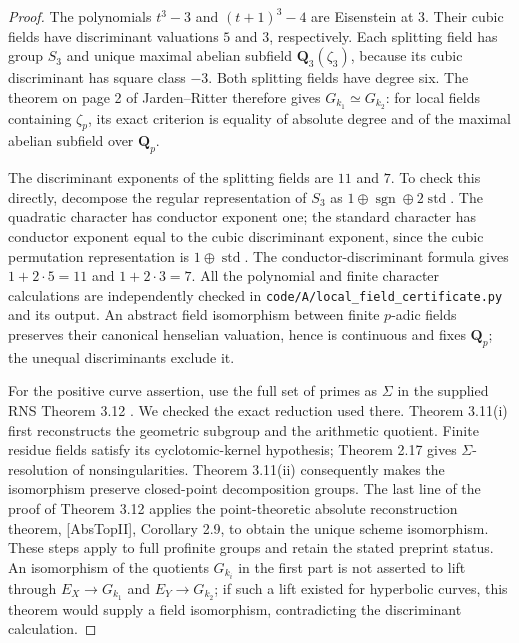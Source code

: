 \begin{proof}
The polynomials $t^3-3$ and $(t+1)^3-4$ are Eisenstein at
$3$. Their cubic fields have discriminant valuations $5$ and
$3$, respectively. Each splitting field has group $S_3$ and
unique maximal abelian subfield $\mathbf Q_3(\zeta_3)$,
because its cubic discriminant has square class $-3$.
Both splitting fields have degree six. The theorem on page 2
of Jarden--Ritter \cite{A_JardenRitter1979} therefore gives
$G_{k_1}\simeq G_{k_2}$: for local fields containing
$\zeta_p$, its exact criterion is equality of absolute degree
and of the maximal abelian subfield over $\mathbf Q_p$.

The discriminant exponents of the splitting fields are $11$
and $7$. To check this directly, decompose the regular
representation of $S_3$ as
$1\oplus\operatorname{sgn}\oplus2\operatorname{std}$.
The quadratic character has conductor exponent one; the
standard character has conductor exponent equal to the
cubic discriminant exponent, since the cubic permutation
representation is $1\oplus\operatorname{std}$. The
conductor-discriminant formula gives $1+2\cdot5=11$ and
$1+2\cdot3=7$. All the polynomial and finite character
calculations are independently checked in
\texttt{code/A/local\_field\_certificate.py} and its output.
An abstract field isomorphism between finite $p$-adic fields
preserves their canonical henselian valuation, hence is
continuous and fixes $\mathbf Q_p$; the unequal discriminants
exclude it.

For the positive curve assertion, use the full set of primes
as $\Sigma$ in the supplied RNS Theorem 3.12
\cite{A_MochizukiTsujimuraRNS}. We checked the exact
reduction used there. Theorem 3.11(i) first reconstructs the
geometric subgroup and the arithmetic quotient. Finite
residue fields satisfy its cyclotomic-kernel hypothesis;
Theorem 2.17 gives $\Sigma$-resolution of nonsingularities.
Theorem 3.11(ii) consequently makes the isomorphism preserve
closed-point decomposition groups. The last line of the
proof of Theorem 3.12 applies the point-theoretic absolute
reconstruction theorem, [AbsTopII], Corollary 2.9, to obtain
the unique scheme isomorphism. These steps apply to full
profinite groups and retain the stated preprint status.
An isomorphism of the quotients $G_{k_i}$ in the first part
is not asserted to lift through $E_X\to G_{k_1}$ and
$E_Y\to G_{k_2}$; if such a lift existed for hyperbolic
curves, this theorem would supply a field isomorphism,
contradicting the discriminant calculation.
\end{proof}

